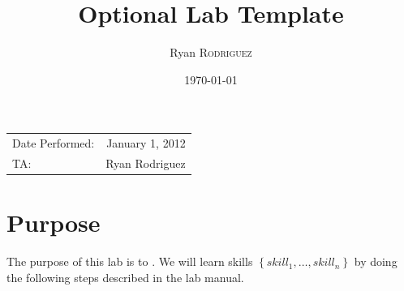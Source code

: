 \documentclass{article}
\title{Optional Lab Template} %
\author{Ryan \textsc{Rodriguez}} %
\date{\today} %
\begin{document}
\maketitle %

\begin{center}
\begin{tabular}{l r}
Date Performed: & January 1, 2012 \\ %
TA: & Ryan Rodriguez %
\end{tabular}
\end{center}



\section{Purpose}

The purpose of this lab is to \underline{\hspace{3cm}}.  We will learn skills $\left \{skill_1, \ldots, skill_n \right \}$ by doing the following steps \underline{\hspace{3cm}} described in the lab manual.

 
\end{document}
